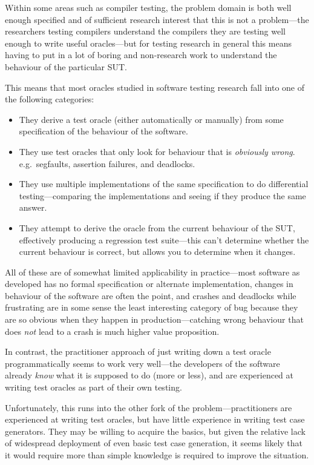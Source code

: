 Within some areas such as compiler testing\cite{DBLP:conf/pldi/YangCER11, DBLP:conf/icse/DonaldsonL16},
the problem domain is both well enough specified and of sufficient research interest that this is not a problem---the
researchers testing compilers understand the compilers they are testing well enough to write useful oracles---but
for testing research in general this means having to put in a lot of boring and non-research work to understand the behaviour of the particular SUT.\ 

This means that most oracles studied in software testing research fall into one of the following categories:

\begin{itemize}
\item They derive a test oracle (either automatically or manually) from some specification of the behaviour of the software.
\item They use test oracles that only look for behaviour that is \emph{obviously wrong}.
e.g.\ segfaults, assertion failures, and deadlocks.
\item They use multiple implementations of the same specification to do differential testing---comparing
the implementations and seeing if they produce the same answer.
\item They attempt to derive the oracle from the current behaviour of the SUT,
effectively producing a regression test suite---this
can't determine whether the current behaviour is correct,
but allows you to determine when it changes.
\end{itemize}

All of these are of somewhat limited applicability in practice---most
software as developed has no formal specification or alternate implementation,
changes in behaviour of the software are often the point,
and crashes and deadlocks while frustrating are in some sense the least interesting category of bug because they are so obvious when they happen in production---catching
wrong behaviour that does \emph{not} lead to a crash is much higher value proposition.

In contrast,
the practitioner approach of just writing down a test oracle programmatically seems to work very well---the
developers of the software already \emph{know} what it is supposed to do (more or less),
and are experienced at writing test oracles as part of their own testing.

Unfortunately,
this runs into the other fork of the problem---practitioners
are experienced at writing test oracles,
but have little experience in writing test case generators.
They may be willing to acquire the basics,
but given the relative lack of widespread deployment of even basic test case generation,
it seems likely that it would require more than simple knowledge is required to improve the situation.

